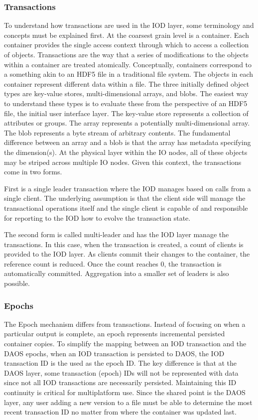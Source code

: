 \documentclass[conference]{IEEEtran} \pdfpagewidth=8.5in
\begin{document}
\subsubsection{Transactions}
To understand how transactions are used in the IOD layer, some terminology and
concepts must be explained first. At the coarsest grain level is a container.
Each container provides the single access context through which to access a
collection of objects. Transactions are the way that a series of modifications
to the objects within a container are treated atomically. Conceptually,
containers correspond to a something akin to an HDF5 file in a traditional
file system. The objects in each container represent different data within a
file.  The three initially defined object types are key-value stores,
multi-dimensional arrays, and blobs.  The easiest way to understand these types
is to evaluate these from the perspective of an HDF5 file, the initial user
interface layer. The key-value store represents a collection of attributes or
groups. The array represents a potentially multi-dimensional array.  The blob
represents a byte stream of arbitrary contents.  The fundamental difference
between an array and a blob is that the array has metadata specifying the
dimension(s). At the physical layer within the IO nodes, all of these objects
may be striped across multiple IO nodes.  Given this context, the transactions
come in two forms.

First is a single leader transaction where the IOD manages based on calls from
a single client. The underlying assumption is that the client side will manage
the transactional operations itself and the single client is capable of and
responsible for reporting to the IOD how to evolve the transaction state. 

The second form is called multi-leader and has the IOD layer manage the
transactions. In this case, when the transaction is created, a count of clients
is provided to the IOD layer. As clients commit their changes to the container,
the reference count is reduced. Once the count reaches 0, the transaction is
automatically committed. Aggregation into a smaller set of leaders is also
possible.

\subsubsection{Epochs}

The Epoch mechanism differs from transactions. Instead of focusing on when a
particular output is complete, an epoch represents incremental persisted
container copies.  To simplify the mapping between an IOD transaction and the
DAOS epochs, when an IOD transaction is persisted to DAOS, the IOD transaction
ID is the used as the epoch ID. The key difference is that at the DAOS layer,
some transaction (epoch) IDs will not be represented with data since not all
IOD transactions are necessarily persisted. Maintaining this ID continuity is
critical for multiplatform use. Since the shared point is the DAOS layer, any
user adding a new version to a file must be able to determine the most recent
transaction ID no matter from where the container was updated last.
\end{document}
